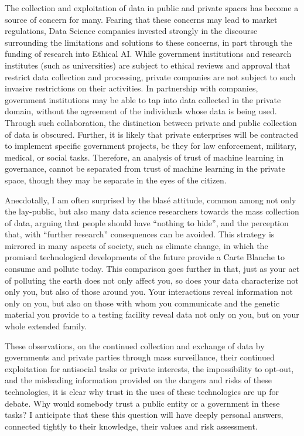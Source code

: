 \documentclass[letterpaper, 10pt]{article} %
\begin{document}
\begin{tcolorbox}[
	blanker,
	width=0.90\textwidth,
	enlarge left by=0.05\textwidth,
	enlarge right by=0.05\textwidth,
	before skip=6pt,
	breakable]
The collection and exploitation of data in public and private spaces has become a source of concern for many.
Fearing that these concerns may lead to market regulations, Data Science companies invested strongly in the discourse surrounding the limitations and solutions to these concerns, in part through the funding of research into Ethical AI.
While government institutions and research institutes (such as universities) are subject to ethical reviews and approval that restrict data collection and processing, private companies are not subject to such invasive restrictions on their activities.
In partnership with companies, government institutions may be able to tap into data collected in the private domain, without the agreement of the individuals whose data is being used.
Through such collaboration, the distinction between private and public collection of data is obscured.
Further, it is likely that private enterprises will be contracted to implement specific government projects, be they for law enforcement, military, medical, or social tasks.
Therefore, an analysis of trust of machine learning in governance, cannot be separated from trust of machine learning in the private space, though they may be separate in the eyes of the citizen.

Anecdotally, I am often surprised by the blas\'{e} attitude, common among not only the lay-public, but also many data science researchers towards the mass collection of data, arguing that people should have “nothing to hide”, and the perception that, with “further research” consequences can be avoided.
This strategy is mirrored in many aspects of society, such as climate change, in which the promised technological developments of the future provide a Carte Blanche to consume and pollute today.
This comparison goes further in that, just as your act of polluting the earth does not only affect you, so does your data characterize not only you, but also of those around you.
Your interactions reveal information not only on you, but also on those with whom you communicate and the genetic material you provide to a testing facility reveal data not only on you, but on your whole extended family.

These observations, on the continued collection and exchange of data by governments and private parties through mass surveillance, their continued exploitation for antisocial tasks or private interests, the impossibility to opt-out, and the misleading information provided on the dangers and risks of these technologies, it is clear why trust in the uses of these technologies are up for debate.
Why would somebody trust a public entity or a government in these tasks?
I anticipate that these this question will have deeply personal answers, connected tightly to their knowledge, their values and risk assessment.


\end{tcolorbox}
\end{document}
